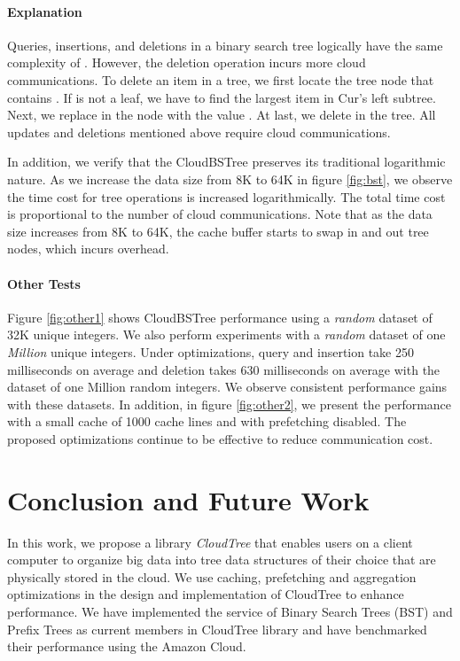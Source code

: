 \documentclass[10pt, conference, compsocconf]{IEEEtran}
\begin{document}
\paragraph{Explanation}
Queries, insertions, and deletions in a binary search tree logically have the same complexity of .
However, the deletion operation incurs more cloud communications. 
To delete an item  in a tree, we first locate the tree node  that contains .
If  is not a leaf, we have to find the largest item  in Cur's left subtree.
Next, we replace  in the node  with the value . At last, we delete  in the tree.
All updates and deletions mentioned above require cloud communications.

 In addition, we verify that the CloudBSTree preserves its traditional logarithmic nature.
As we increase the data size from 8K to 64K in figure \ref{fig:bst}, we observe the time cost for 
 tree operations is increased logarithmically. The total time cost is proportional to the 
 number of cloud communications. 
 Note that as the data size increases from 8K to 64K, the cache buffer starts to swap in and out 
 tree nodes, which incurs overhead.

\paragraph{Other Tests}
Figure \ref{fig:other1} shows CloudBSTree performance using a \emph{random} dataset of 32K unique integers.
We also perform experiments with a \emph{random} dataset of one \emph{Million} unique integers. 
Under optimizations, query and insertion take 250 milliseconds on average and deletion takes
 630 milliseconds on average with the dataset of one Million random integers.
 We observe consistent performance gains with these datasets.
 In addition, in figure \ref{fig:other2}, we present the performance with a small cache of 1000 cache lines and with
  prefetching disabled. The proposed optimizations continue to be effective to reduce communication cost.
  
  




 



\section{Conclusion and Future Work}
In this work, we propose a library \emph{CloudTree} that enables users on a client computer to organize big data into tree data
 structures of their choice that are physically stored in the cloud.
We use caching, prefetching and aggregation optimizations in the
  design and implementation of CloudTree to enhance performance.
  We have implemented the service of Binary Search Trees (BST) and
  Prefix Trees as current members in CloudTree library and have benchmarked
  their performance using the Amazon Cloud.
  
\end{document}
